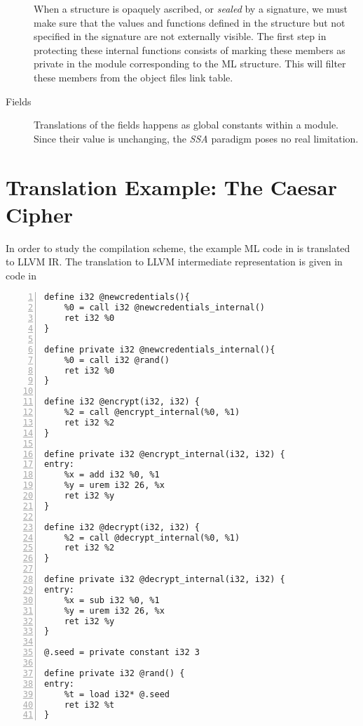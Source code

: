 \begin{description}
When a structure is opaquely ascribed, or \emph{sealed} by a signature, we must make sure that the values and functions defined in the structure but not specified in the signature are not externally visible. The first step in protecting these internal functions consists of marking these members as private in the module corresponding to the ML structure. This will filter these members from the object files link table. %


\item[Fields]
Translations of the fields happens as global constants within a module. Since their value is unchanging, the \emph{SSA} paradigm poses no real limitation.

\end{description}

\section{Translation Example: The Caesar Cipher}
In order to study the compilation scheme, the example ML code in  is translated to LLVM IR. The translation to LLVM intermediate representation is given in code in 

\begin{lstlisting}[frame=single,numbers=left, language={[x86masm]Assembler}, caption=LLVM IR for the example,
label=llvm:Example]
define i32 @newcredentials(){
	%0 = call i32 @newcredentials_internal()
	ret i32 %0
}

define private i32 @newcredentials_internal(){
	%0 = call i32 @rand()
	ret i32 %0
}

define i32 @encrypt(i32, i32) {
	%2 = call @encrypt_internal(%0, %1)
	ret i32 %2
}

define private i32 @encrypt_internal(i32, i32) { 
entry:
	%x = add i32 %0, %1
	%y = urem i32 26, %x 
	ret i32 %y
}

define i32 @decrypt(i32, i32) { 
	%2 = call @decrypt_internal(%0, %1)
	ret i32 %2
}

define private i32 @decrypt_internal(i32, i32) { 
entry:
	%x = sub i32 %0, %1
	%y = urem i32 26, %x 
	ret i32 %y
}

@.seed = private constant i32 3	

define private i32 @rand() {
entry:
	%t = load i32* @.seed
	ret i32 %t
}
\end{lstlisting}


